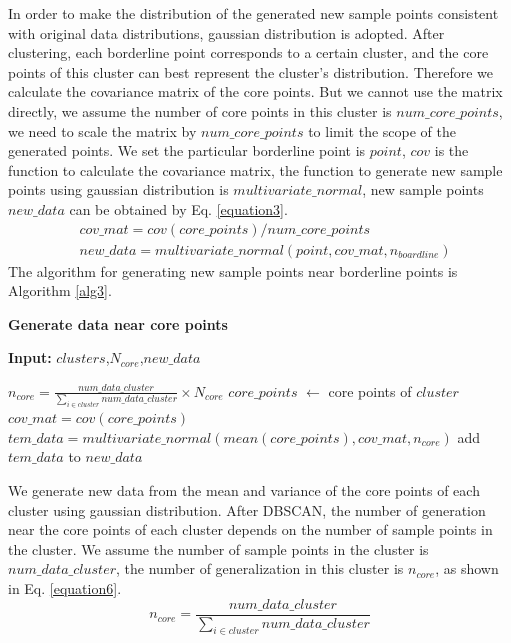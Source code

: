 \documentclass[ida]{iosart2x}
\begin{document}
In order to make the distribution of the generated new sample points 
consistent with original data distributions,
gaussian distribution is adopted.
After clustering, each borderline point corresponds to a certain cluster, 
and the core points of this cluster can best represent the cluster's distribution.
Therefore we calculate the covariance matrix of the core points. 
But we cannot use the matrix directly, we 
assume the number of core points in this cluster is $num\_core\_points$,
we need to scale the matrix by $num\_core\_points$ to limit 
the scope of the generated points.
We set the particular borderline point is $point$, 
$cov$ is the function to calculate the covariance matrix,
the function to generate new sample points using 
gaussian distribution is $multivariate\_normal$,
new sample points $new\_data$ can be obtained by Eq. \ref{equation3}.
\begin{equation}
  \label{equation3}
  \begin{aligned}
      & cov\_mat=cov(core\_points)/num\_core\_points \\
      & new\_data=multivariate\_normal(point,cov\_mat,n_{boardline})
  \end{aligned}
\end{equation}
The algorithm for generating new sample points near borderline points is Algorithm \ref{alg3}.

\textbf{Generate data near core points}
\begin{algorithm}[tb]
  \caption{$generate\_core$}
  \label{alg4}
  \hspace*{0.02in} {\bf Input:} $clusters$,$N_{core}$,$new\_data$
  \begin{algorithmic}
    \State $n_{core}=\frac{num\_data\_cluster}{\sum_{i \in cluster} num\_data\_cluster} \times N_{core}$
    \State $core\_points$ $\leftarrow$ core points of $cluster$
    \State $cov\_mat=cov(core\_points)$
    \State $tem\_data=multivariate\_normal(mean(core\_points),cov\_mat,n_{core})$
    \State add $tem\_data$ to $new\_data$
  \EndFor
  \end{algorithmic}
\end{algorithm}
We generate new data from the mean and variance of the 
core points of each cluster using gaussian distribution.
After DBSCAN, 
the number of generation near the core points of each cluster depends 
on the number of sample points in the cluster.
We assume the number of sample points in the cluster is $num\_data\_cluster$, 
 the number of generalization in this cluster is $n_{core}$, as shown in Eq. \ref{equation6}.
 \begin{equation}
  \label{equation6}
  n_{core}=\frac{num\_data\_cluster}{\sum_{i \in cluster} num\_data\_cluster}
\end{equation}
  
\end{document}
